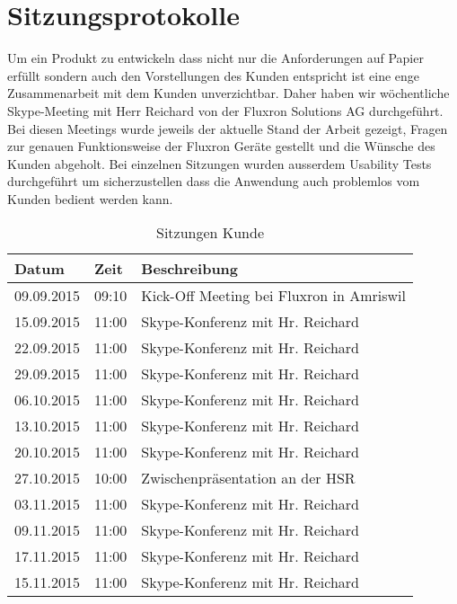 \chapter{Sitzungsprotokolle}
\label{Sitzungsprotokolle}

Um ein Produkt zu entwickeln dass nicht nur die Anforderungen auf Papier erfüllt sondern auch den Vorstellungen des Kunden entspricht ist eine enge Zusammenarbeit mit dem Kunden unverzichtbar. Daher haben wir wöchentliche Skype-Meeting mit Herr Reichard von der Fluxron Solutions AG durchgeführt. Bei diesen Meetings wurde jeweils der aktuelle Stand der Arbeit gezeigt, Fragen zur genauen Funktionsweise der Fluxron Geräte gestellt und die Wünsche des Kunden abgeholt. Bei einzelnen Sitzungen wurden ausserdem Usability Tests durchgeführt um sicherzustellen dass die Anwendung auch problemlos vom Kunden bedient werden kann.

\begin{table}[H]
\begin{tabularx}{\textwidth}{ l | l | X}
\textbf{Datum}& \textbf{Zeit} & \textbf{Beschreibung}\\ \hline
09.09.2015 & 09:10 & Kick-Off Meeting bei Fluxron in Amriswil\\ \hline
15.09.2015 & 11:00 & Skype-Konferenz mit Hr. Reichard\\ \hline
22.09.2015 & 11:00 & Skype-Konferenz mit Hr. Reichard\\ \hline
29.09.2015 & 11:00 & Skype-Konferenz mit Hr. Reichard\\ \hline
06.10.2015 & 11:00 & Skype-Konferenz mit Hr. Reichard\\ \hline
13.10.2015 & 11:00 & Skype-Konferenz mit Hr. Reichard\\ \hline
20.10.2015 & 11:00 & Skype-Konferenz mit Hr. Reichard\\ \hline
27.10.2015 & 10:00 & Zwischenpräsentation an der \ac{HSR}\\ \hline
03.11.2015 & 11:00 & Skype-Konferenz mit Hr. Reichard\\ \hline
09.11.2015 & 11:00 & Skype-Konferenz mit Hr. Reichard\\ \hline
17.11.2015 & 11:00 & Skype-Konferenz mit Hr. Reichard\\ \hline
15.11.2015 & 11:00 & Skype-Konferenz mit Hr. Reichard\\
\end{tabularx}
\caption{Sitzungen Kunde}
\end{table}

